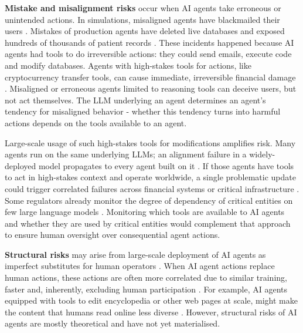 \documentclass[manuscript,screen,nonacm,oneside]{acmart}
\begin{document}
\textbf{Mistake and misalignment risks} occur when AI agents take erroneous or unintended actions. In simulations, misaligned agents have blackmailed their users \citep{anthropicAgenticMisalignment}. Mistakes of production agents have deleted live databases and exposed hundreds of thousands of patient records \citep{fortuneAIpoweredCoding, abaSleepwalkingInto}. These incidents happened because AI agents had tools to do irreversible actions: they could send emails, execute code and modify databases. Agents with high-stakes tools for actions, like cryptocurrency transfer tools, can cause immediate, irreversible financial damage \citep{hammond2025multiagentrisksadvancedai}. Misaligned or erroneous agents limited to reasoning tools can deceive users, but not act themselves. The LLM underlying an agent determines an agent's tendency for misaligned behavior - whether this tendency turns into harmful actions depends on the tools available to an agent.  

Large-scale usage of such high-stakes tools for modifications amplifies risk. Many agents run on the same underlying LLMs; an alignment failure in a widely-deployed model propagates to every agent built on it \citep{vipra2023market}. If those agents have tools to act in high-stakes context and operate worldwide, a single problematic update could trigger correlated failures across financial systems or critical infrastructure \citep{tomasev2025virtual}. Some regulators already monitor the degree of dependency of critical entities on few large language models \citep{bankofenglandBankEnglands}. Monitoring which tools are available to AI agents and whether they are used by critical entities would complement that approach to ensure human oversight over consequential agent actions. 

\textbf{Structural risks} may arise from large-scale deployment of AI agents as imperfect substitutes for human operators \citep{kulveit2025gradual}. When AI agent actions replace human actions, these actions are often more correlated due to similar training, faster and, inherently, excluding human participation \citep{laurito2025aiai}. For example, AI agents equipped with tools to edit encyclopedia or other web pages at scale, might make the content that humans read online less diverse \citep{battista2024political, qiu2025lockin}. However, structural risks of AI agents are mostly theoretical and have not yet materialised.
\end{document}
